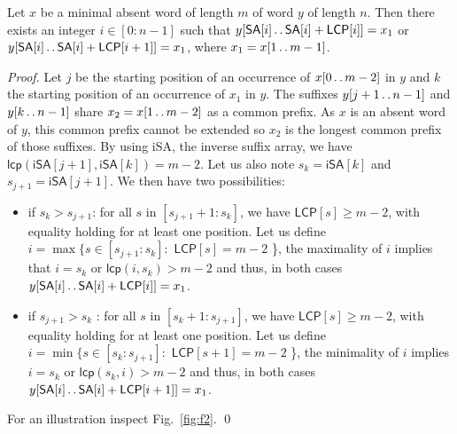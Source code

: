 \documentclass{llncs}
\def\dd{\mathinner{.\,.}}
\newcommand{\SA}{\textsf{SA}}
\newcommand{\iSA}{\textsf{iSA}}
\newcommand{\LCP}{\textsf{LCP}}
\newcommand{\lcp}{\textsf{lcp}}
\begin{document}
\begin{lemma} 
\label{lem:f2}
  Let $x$ be a minimal absent word of length $m$ of word $y$ of length $n$. Then there exists an integer $i \in [0:n-1]$ 
such that \textnormal{$y[\SA{}[i]\dd \SA{}[i]+\LCP{}[i]]=x_1$} or \textnormal{$y[\SA{}[i]\dd \SA{}[i]+\LCP{}[i+1]]=x_1$}, where $x_1=x[1\dd m-1]$.
\end{lemma}
\begin{proof}
  Let $j$ be the starting position of an occurrence of $x[0\dd m-2]$ in $y$ and $k$ the starting position of an occurrence of $x_1$ in $y$.
  The suffixes $y[j+1\dd n-1]$ and $y[k\dd n-1]$ share $x_2=x[1\dd m-2]$ as a common prefix.
  As $x$ is an absent word of $y$, this common prefix cannot be extended so $x_2$ is the longest common prefix of those suffixes.
  By using \iSA{}, the inverse suffix array, we have $\lcp{}(\iSA{}[j+1],\iSA{}[k])=m-2$. Let us also note $s_k=\iSA{}[k]$
  and $s_{j+1}=\iSA{}[j+1]$. We then have two possibilities:
\begin{itemize}
  \item if $s_k > s_{j+1}$: \quad for all $s$ in $[s_{j+1}+1:s_k]$, we have
    $\LCP{}[s]\geq m-2$, with equality holding for at least one position.
        Let us define $i=\max\{s \in [s_{j+1}:s_k]:$ $\LCP{}[s]=m-2$ \},
    the maximality of $i$ implies that $i=s_k$ or $\lcp{}(i,s_k)>m-2$ and thus, in both cases
    $y[\SA{}[i]\dd \SA{}[i]+\LCP{}[i]]=x_1$.
  \item if $s_{j+1} > s_k$ : \quad for all $s$ in $[s_k+1:s_{j+1}]$, we have
    $\LCP{}[s]\geq m-2$, with equality holding for at least one position.
        Let us define $i=\min\{s \in [s_k:s_{j+1}]:$ $\LCP{}[s+1]=m-2$ \}, 
        the minimality of $i$ implies $i=s_k$ or $\lcp{}(s_k,i)>m-2$ and thus, in both cases
    $y[\SA{}[i]\dd \SA{}[i]+\LCP{}[i+1]]=x_1$.
\end{itemize}
For an illustration inspect Fig.~\ref{fig:f2}. \qed
\end{proof}
\end{document}

